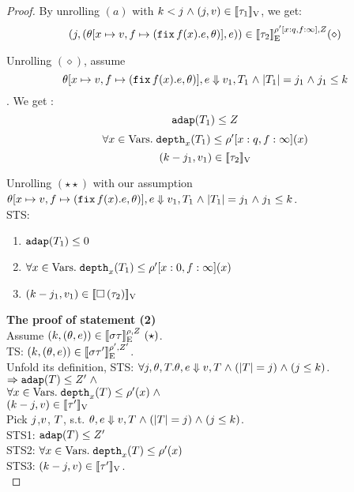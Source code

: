 \begin{proof}
By unrolling $(a)$ with $\stepiA < \stepiB \conj (j, \valr) \in
\lrv{\type_1}$, we get:
 \[
(\stepiB, (\env[x \mapsto \valr, f \mapsto (\efix f(x).\expr,
\env)], \expr)) \in \lre{\dmap'[x: \nnatbiA, f:
  \infty]}{\nnatA}{  \type_2 } (\diamond)
\]

Unrolling $(\diamond)$, assume \[ \env[x \mapsto \valr, f \mapsto (\efix f(x).\expr,
\env)], \expr \bigstep \valr_1, \tr_1 \conj |\tr_1| = \stepiB_1 \conj
\stepiB_1 \leq \stepiA \] .
We get : $$ \adap(\tr_1) \leq \nnatA $$
         $$\forall x \in \mbox{Vars}.\eapp  \ddep{x}(\tr_1) \leq
         \dmap'[x: \nnatbiA, f: \infty](x)$$
         $$  (\stepiA - \stepiB_1,  \valr_1) \in \lrv{\type_2}$$

Unrolling $(\star\star)$ with our assumption $ \env[x \mapsto \valr, f \mapsto (\efix f(x).\expr,
\env)], \expr \bigstep \valr_1, \tr_1 \conj |\tr_1| = \stepiB_1 \conj
\stepiB_1 \leq \stepiA $. \\ 
 STS:
\begin{enumerate}
\item $ \adap(\tr_1) \leq 0 $ \\    
\item $\forall x \in \mbox{Vars}.\eapp  \ddep{x}(\tr_1) \leq
         \dmap'[x: 0, f: \infty](x)$ \\
\item $  (\stepiA - \stepiB_1,  \valr_1) \in \lrv{\tbox {\type_2} }$ \\
\end{enumerate}
  

\textbf{The proof of statement (2)} \\
Assume $(\stepiA, (\env, \expr)) \in
 \lre{\dmap}{\nnatA}{\ienv \type}~(\star)$. \\
%


TS: $(\stepiA, (\env, \expr)) \in
 \lre{\dmap'}{\nnatA'}{\ienv \type'}$.\\
Unfold its definition, STS:
$ \forall \stepiB, \env, \tr.  \env, \expr \bigstep \valr, \tr \conj
(\size{\tr} = \stepiB) \conj (\stepiB \leq \stepiA) $.\\
$\Rightarrow \adap(\tr) \leq \nnatA' \conj$\\
$\forall x \in \mbox{Vars}.\eapp  \ddep{x}(\tr) \leq \dmap'(x)\conj$\\
$ (\stepiA - \stepiB,  \valr) \in \lrv{\type'}$\\
%
Pick  $\stepiB$,$\valr$,  $\tr$, s.t.
$\env, \expr \bigstep \valr, \tr \conj
(\size{\tr} = \stepiB) \conj (\stepiB \leq \stepiA) $.\\
STS1: $\adap(\tr) \leq \nnatA' $ \\
STS2: $\forall x \in \mbox{Vars}.\eapp  \ddep{x}(\tr) \leq
\dmap'(x)$\\
STS3: $ (\stepiA - \stepiB,  \valr) \in \lrv{\type'}  $.\\



\end{proof}
